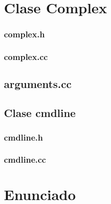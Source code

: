 \documentclass[10pt,a4paper]{article}
\begin{document}
\section{Clase Complex}
\subsubsection*{complex.h}

\subsubsection*{complex.cc}

\subsection*{arguments.cc}

\subsection{Clase cmdline}
\subsubsection*{cmdline.h}

\subsubsection*{cmdline.cc}


\newpage
\section{Enunciado}
\end{document}
